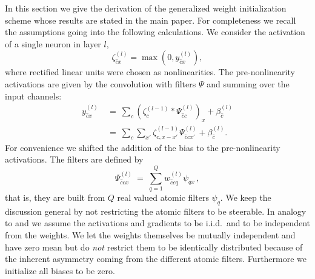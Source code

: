 \documentclass[10pt,twocolumn,letterpaper]{article}
\begin{document}
In this section we give the derivation of the generalized weight initialization scheme whose results are stated in the main paper.
For completeness we recall the assumptions going into the following calculations.
We consider the activation of a single neuron in layer $l,$
\begin{equation}\label{eq:Activation}
	\zeta_{\hat{c}x}^{(l)}=\max(0,y_{\hat{c}x}^{(l)}),
\end{equation}
where rectified linear units were chosen as nonlinearities.
The pre-nonlinearity activations are given by the convolution with filters $\Psi$ and summing over the input channels:
\begin{equation}\label{eq:preNonlinearityActivation}
\begin{split}
	y_{\hat{c}x}^{(l)}\ 
	&=\ \sum_{c}\left(\zeta_{c}^{(l-1)} \ast \Psi_{\hat{c}c}^{(l)}\right)_x + \beta_{\hat{c}}^{(l)} \\
	&=\ \sum_{c}\sum_{x'} \zeta_{c,x-x'}^{(l-1)} \Psi_{\hat{c}cx'}^{(l)} + \beta_{\hat{c}}^{(l)}.
\end{split}
\end{equation}
For convenience we shifted the addition of the bias to the pre-nonlinearity activations.
The filters are defined by
\[
	\Psi_{\hat{c}cx}^{(l)}\ =\ \sum_{q=1}^Q w_{\hat{c}cq}^{(l)}\psi_{qx} \,,
\]
that is, they are built from $Q$ real valued atomic filters $\psi_{q}$.
We keep the discussion general by not restricting the atomic filters to be steerable.
In analogy to \citet{Glorot10understandingthe} and \citet{DBLP:journals/corr/HeZR015} we assume the activations and gradients to be i.i.d.~and to be independent from the weights. We let the weights themselves be mutually independent and have zero mean but do \emph{not} restrict them to be identically distributed because of the inherent asymmetry coming from the different atomic filters. Furthermore we initialize all biases to be zero.
\end{document}

